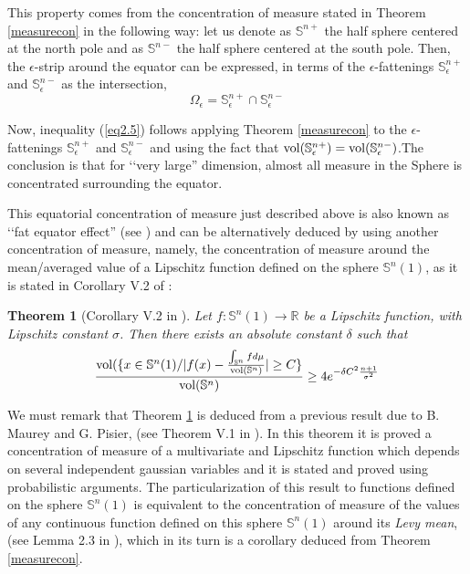 \documentclass{amsart}
\newtheorem{theoremA}{Theorem}
\theoremstyle{definition}
\theoremstyle{remark}
\newcommand{\erre}{\mathbb{R}}
\newcommand{\ese}{\mathbb{S}}
\begin{document}
This property comes from the concentration of measure stated in Theorem \ref{measurecon} in the following way: let us denote as $\mathbb{S}^{n+}$ the half sphere centered at the north pole and  as $\mathbb{S}^{n-}$ the half sphere centered at the south pole. Then, the $\epsilon$-strip around the equator can be expressed, in terms of the $\epsilon$-fattenings $\mathbb{S}^{n+}_{\epsilon}$ and $\mathbb{S}^{n-}_{\epsilon}$ as the intersection, 
$$\Omega_\epsilon=\mathbb{S}^{n+}_{\epsilon} \cap\mathbb{S}^{n-}_{\epsilon} $$


\noindent Now, inequality (\ref{eq2.5}) follows applying Theorem \ref{measurecon} to the $\epsilon$-fattenings $\mathbb{S}^{n+}_{\epsilon}$ and $\mathbb{S}^{n-}_{\epsilon}$ and using the fact that ${\rm vol}(\mathbb{S}^{n+}_\epsilon)={\rm vol}(\mathbb{S}^{n-}_\epsilon)$.The conclusion is that for  \lq\lq very large'' dimension,  almost all measure in the Sphere is concentrated surrounding  the equator. 

This equatorial concentration of measure just described above is also known as \lq\lq fat equator effect'' (see \cite{Bengtsson}) 
and can be alternatively deduced by using another concentration of measure, namely, the concentration of measure around the mean/averaged value of a Lipschitz function defined on the sphere $\ese^n(1)$, as it is stated in Corollary V.2 of \cite{MS}:

\begin{theoremA}[Corollary V.2 in \cite{MS}]\label{thB}
Let $f: \ese^n(1) \rightarrow \erre$ be a Lipschitz function, with Lipschitz constant $\sigma$. Then there exists an absolute constant $\delta$ such that
\begin{equation}
\frac{{\rm vol}(\{ x \in \ese^n(1) / \vert f(x)- \frac{\int_{\ese^n} f d\mu}{{\rm vol}(\ese^n)}\vert\geq C\} }{{\rm vol}(\ese^n) } \geq 4 e^{-\delta C^2\frac{n+1}{\sigma^2}}
\end{equation}

\end{theoremA}
We must remark that Theorem \ref{thB} is deduced from a previous result due to B. Maurey and G. Pisier, (see Theorem V.1 in \cite{MS}). In this theorem it is proved a concentration of measure of a multivariate and Lipschitz function which depends on several independent gaussian variables and it is stated and proved using probabilistic arguments. The particularization of this result to  functions defined on the sphere $\ese^n(1)$ is equivalent to the concentration of measure of the values of any continuous function defined on this sphere $\ese^n(1)$ around its {\em Levy mean}, (see Lemma 2.3 in \cite{MS}), which in its turn is a corollary deduced from Theorem \ref{measurecon}. 
\end{document}
